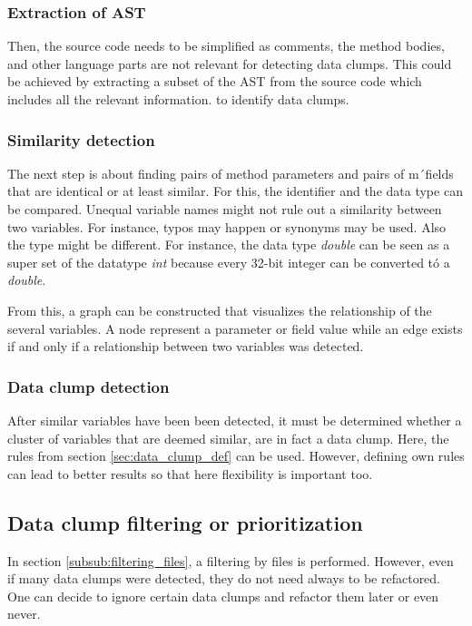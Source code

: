 \subsubsection{Extraction of AST}
Then,  the source code needs to be simplified as comments, the method bodies, and other language parts are not relevant for detecting data clumps. This could be achieved by extracting a subset of the \ac{AST} from the source code which includes all the relevant information. to identify data clumps.
\subsubsection{Similarity detection}

The next step is about finding pairs of method parameters and pairs of m´fields that are identical or at least similar.  For this, the identifier and the  data type  can be compared. Unequal variable names might not rule out a similarity between two variables. For instance, typos may happen or synonyms may be used. Also the type might be different. For instance, the data type \textit{double} can be seen as a super set of the datatype \textit{int} because every 32-bit integer can be converted tó a \textit{double}.

From this, a graph can be constructed that visualizes the relationship of the several variables. A node represent a parameter or field value while an edge exists if and only if a relationship between two variables was detected. 

\subsubsection{Data clump detection}
After similar variables have been been detected, it must be determined whether a cluster of variables that are deemed similar, are in fact a data clump. Here, the rules from section \ref{sec:data_clump_def} can be used. However, defining own rules can lead to better results so that  here flexibility is important too. 

\subsection{Data clump filtering or prioritization}
In section \ref{subsub:filtering_files}, a filtering by files is performed. However, even if many data clumps were detected, they do not need always to be refactored. One can decide to ignore certain data clumps and refactor them later or even never. 

